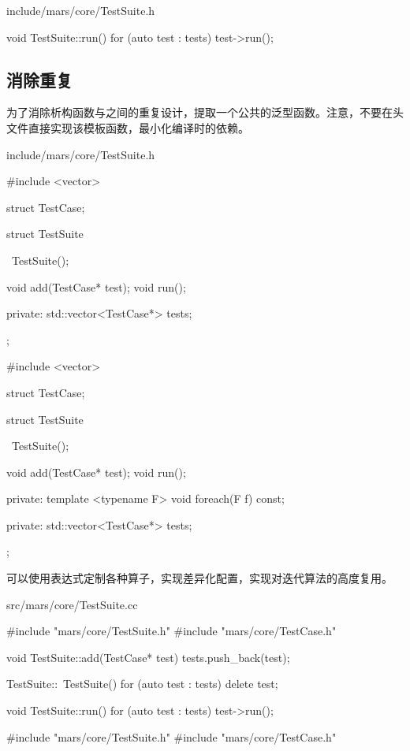 \begin{content}
\begin{diff}{include/mars/core/TestSuite.h}
\begin{minicpp}
void TestSuite::run() {
  for (auto test : tests) {
    test->run();
  }
}
 \end{minicpp}
\end{diff}

\subsection{消除重复}

为了消除析构函数与之间的重复设计，提取一个公共的泛型函数。注意，不要在头文件直接实现该模板函数，最小化编译时的依赖。

\begin{diff}{include/mars/core/TestSuite.h}
 \begin{minicpp}
#include <vector>

struct TestCase;

struct TestSuite {
  ~TestSuite();

  void add(TestCase* test);
  void run();

private:
  std::vector<TestCase*> tests;
};
 \end{minicpp}
\tcblower
 \begin{minicpp}
#include <vector>

struct TestCase;

struct TestSuite {
  ~TestSuite();

  void add(TestCase* test);
  void run();

private:
  template <typename F>
  void foreach(F f) const;

private:
  std::vector<TestCase*> tests;
};
 \end{minicpp}
\end{diff}

可以使用表达式定制各种算子，实现差异化配置，实现对迭代算法的高度复用。

\begin{diff}{src/mars/core/TestSuite.cc}
 \begin{minicpp}
#include "mars/core/TestSuite.h"
#include "mars/core/TestCase.h"

void TestSuite::add(TestCase* test) {
  tests.push_back(test);
}

TestSuite::~TestSuite() {
  for (auto test : tests) {
    delete test;
  }
}

void TestSuite::run() {
  for (auto test : tests) {
    test->run();
  }
}
 \end{minicpp}
\tcblower
 \begin{minicpp}
#include "mars/core/TestSuite.h"
#include "mars/core/TestCase.h"


\end{minicpp}
\end{diff}
\end{content}
